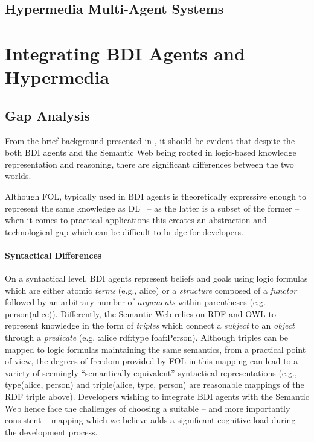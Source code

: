 \documentclass[
]{ceurart}
\begin{document}
\subsection{Hypermedia Multi-Agent Systems}


\section{Integrating \acs{BDI} Agents and Hypermedia}
\label{sec:integrating-bdi-hypermedia}

\subsection{Gap Analysis}

From the brief background presented in , 
it should be evident that
despite the both \ac{BDI} agents and the Semantic Web being rooted in logic-based knowledge representation and reasoning,
there are significant differences between the two worlds.

Although \ac{FOL}, typically used in \ac{BDI} agents is theoretically expressive enough to represent the same knowledge as \ac{DL}~\missingref{} 
-- as the latter is a subset of the former --
when it comes to practical applications this creates an abstraction and technological gap
which can be difficult to bridge for developers.

\paragraph{Syntactical Differences}

On a syntactical level, \ac{BDI} agents represent beliefs and goals using logic formulas which are either atomic \emph{terms} (e.g., \textsf{alice}) or a \emph{structure} composed of a \emph{functor} followed by an arbitrary number of \emph{arguments} within parentheses (e.g. \textsf{person(alice)}).
%
Differently, the Semantic Web relies on \ac{RDF} and \ac{OWL} to represent knowledge in the form of \emph{triples} which connect a \emph{subject} to an \emph{object} through a \emph{predicate} (e.g. \textsf{:alice rdf:type foaf:Person}).
%
Although triples can be mapped to logic formulas maintaining the same semantics, from a practical point of view, the degrees of freedom provided by \ac{FOL} in this mapping can lead to a variety of seemingly ``semantically equivalent'' syntactical representations (e.g., \textsf{type(alice, person)} and \textsf{triple(alice, type, person)} are reasonable mappings of the \ac{RDF} triple above).
%
Developers wishing to integrate \ac{BDI} agents with the Semantic Web hence face the challenges of choosing a suitable -- and more importantly consistent -- mapping which we believe adds a significant cognitive load during the development process.
\end{document}
